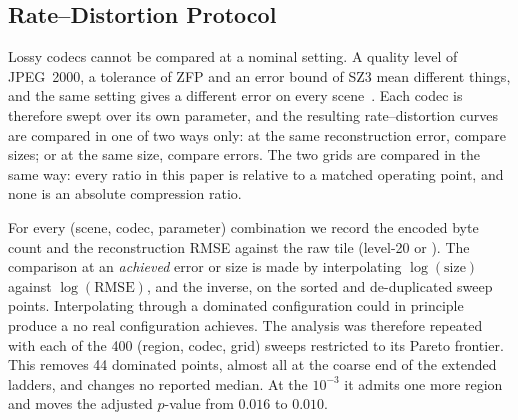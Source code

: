 \subsection{Rate--Distortion Protocol}
\label{sec:rd_protocol}
Lossy codecs cannot be compared at a nominal setting. A quality level of
JPEG~2000, a tolerance of ZFP and an error bound of SZ3 mean different
things, and the same setting gives a different error on every
scene~\cite{lindstrom2014zfp,liang2022sz3}. Each codec is therefore swept
over its own parameter, and the resulting rate--distortion curves are
compared in one of two ways only: at the same reconstruction error,
compare sizes; or at the same size, compare errors. The two grids are compared in the same way: every ratio in this paper
is relative to a matched operating point, and none is an absolute
compression ratio.

For every (scene, codec, parameter) combination we record the encoded byte
count and the reconstruction RMSE against the raw tile (level-20 
or ). The comparison at an \emph{achieved} error or size is
made by interpolating $\log(\text{size})$ against $\log(\text{RMSE})$,
and the inverse, on the sorted and de-duplicated sweep points.
Interpolating through a dominated configuration could in principle
produce a  no real configuration achieves. The analysis was
therefore repeated with each of the 400 (region, codec, grid) sweeps
restricted to its Pareto frontier. This removes 44 dominated points,
almost all at the coarse end of the extended ladders, and changes no
reported median. At the $10^{-3}$  it admits one more region and
moves the adjusted $p$-value from $0.016$ to $0.010$.


